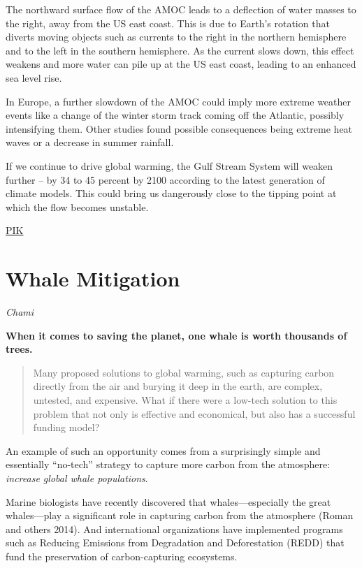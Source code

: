 \documentclass[
]{book}
\begin{document}
The northward surface flow of the AMOC leads to a deflection of water masses to the right, away from the US east coast. This is due to Earth's rotation that diverts moving objects such as currents to the right in the northern hemisphere and to the left in the southern hemisphere. As the current slows down, this effect weakens and more water can pile up at the US east coast, leading to an enhanced sea level rise.

In Europe, a further slowdown of the AMOC could imply more extreme weather events like a change of the winter storm track coming off the Atlantic, possibly intensifying them. Other studies found possible consequences being extreme heat waves or a decrease in summer rainfall.

If we continue to drive global warming, the Gulf Stream System will weaken further -- by 34 to 45 percent by 2100 according to the latest generation of climate models.
This could bring us dangerously close to the tipping point at which the flow becomes unstable.

\href{https://www.pik-potsdam.de/en/news/latest-news/gulf-stream-system-at-its-weakest-in-over-a-millennium}{PIK}

\hypertarget{whale-mitigation}{%
\section{Whale Mitigation}\label{whale-mitigation}}

\emph{Chami}

\textbf{When it comes to saving the planet, one whale is worth thousands of trees.}

\begin{quote}
Many proposed solutions to global warming, such as capturing carbon directly from the air and burying it deep in the earth, are complex, untested, and expensive. What if there were a low-tech solution to this problem that not only is effective and economical, but also has a successful funding model?
\end{quote}

An example of such an opportunity comes from a surprisingly simple and essentially ``no-tech'' strategy to capture more carbon from the atmosphere: \emph{increase global whale populations}.

Marine biologists have recently discovered that whales---especially the great whales---play a significant role in capturing carbon from the atmosphere (Roman and others 2014). And international organizations have implemented programs such as Reducing Emissions from Degradation and Deforestation (REDD) that fund the preservation of carbon-capturing ecosystems.
\end{document}
